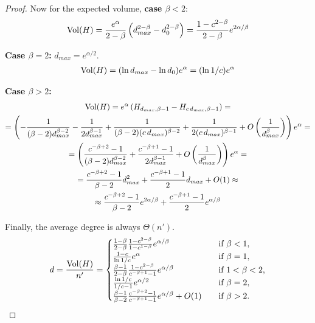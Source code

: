 \begin{proof}
    Now for the expected volume, \textbf{case $\beta<2$}:
    \begin{gather*}
        \operatorname*{Vol}(H)=\frac{e^\alpha}{2-\beta}\left(d_{max}^{2-\beta}-d_0^{2-\beta}\right)
        =\frac{1-c^{2-\beta}}{2-\beta}e^{2\alpha/\beta}
    \end{gather*}
    
    \textbf{Case $\beta=2$:}
    $d_{max}=e^{\alpha/2}$.
    \begin{gather*}
        \operatorname*{Vol}(H)=(\ln d_{max}-\ln d_0)e^\alpha=(\ln 1/c)e^\alpha
    \end{gather*}
    
    \textbf{Case $\beta>2$:}
    \begin{gather*}
        \operatorname*{Vol}(H)=e^\alpha\left(H_{d_{max},\beta-1}-H_{c\,d_{max},\beta-1}\right)=\\
        =\left(
            -\frac{1}{(\beta-2)d_{max}^{\beta-2}}-\frac{1}{2d_{max}^{\beta-1}}
            +\frac{1}{(\beta-2)(c\,d_{max})^{\beta-2}}+\frac{1}{2(c\,d_{max})^{\beta-1}}+O\left(\frac{1}{d_{max}^\beta}\right)
        \right)e^\alpha=\\
        =\left(\frac{c^{-\beta+2}-1}{(\beta-2)d_{max}^{\beta-2}}+\frac{c^{-\beta+1}-1}{2d_{max}^{\beta-1}}+O\left(\frac{1}{d_{max}^\beta}\right)\right)e^\alpha=\\
        =\frac{c^{-\beta+2}-1}{\beta-2}d_{max}^2+\frac{c^{-\beta+1}-1}{2}d_{max}+O(1)\approx\\
        \approx\frac{c^{-\beta+2}-1}{\beta-2}e^{2\alpha/\beta}+\frac{c^{-\beta+1}-1}{2}e^{\alpha/\beta}
    \end{gather*}

    Finally, the average degree is always $\Theta(n')$.
    \begin{equation*}
        d=\frac{\operatorname*{Vol}(H)}{n'}=
        \begin{cases}
            \frac{1-\beta}{2-\beta}\frac{1-c^{2-\beta}}{1-c^{1-\beta}}e^{\alpha/\beta} & \quad \text{if } \beta<1,\\
            \frac{1-c}{\ln 1/c}e^\alpha & \quad \text{if } \beta=1,\\
            \frac{\beta-1}{2-\beta}\frac{1-c^{2-\beta}}{c^{-\beta+1}-1}e^{\alpha/\beta} & \quad \text{if } 1<\beta<2,\\
            \frac{\ln 1/c}{1/c-1}e^{\alpha/2} & \quad \text{if } \beta=2,\\
            \frac{\beta-1}{\beta-2}\frac{c^{-\beta+2}-1}{c^{-\beta+1}-1}e^{\alpha/\beta}+O(1) & \quad \text{if } \beta>2.
        \end{cases}
    \end{equation*}
\end{proof}

